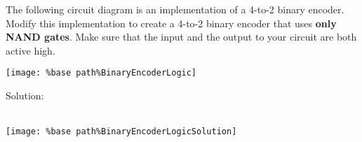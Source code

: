 The following circuit diagram is an implementation of a 4-to-2 binary encoder.  Modify this implementation to create a 4-to-2 binary encoder that uses \textbf{only NAND gates}.  Make sure that the input and the output to your circuit are both active high.
\begin{center}
  \texttt{[image: \%base path\%BinaryEncoderLogic]}
\end{center}

Solution: \\ \\
\begin{center}
  \texttt{[image: \%base path\%BinaryEncoderLogicSolution]}
\end{center}

